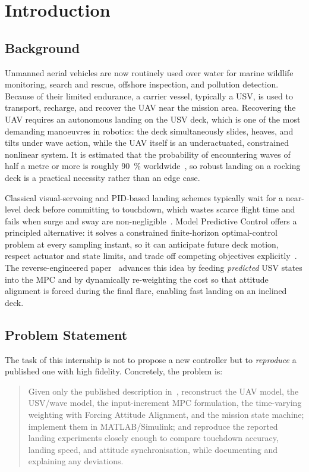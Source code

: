 \documentclass[12pt,a4paper]{report}
\begin{document}
\chapter{Introduction}

\section{Background}
Unmanned aerial vehicles are now routinely used over water for marine wildlife monitoring, search and rescue, offshore inspection, and pollution detection. Because of their limited endurance, a carrier vessel, typically a USV, is used to transport, recharge, and recover the UAV near the mission area. Recovering the UAV requires an autonomous landing on the USV deck, which is one of the most demanding manoeuvres in robotics: the deck simultaneously slides, heaves, and tilts under wave action, while the UAV itself is an underactuated, constrained nonlinear system. It is estimated that the probability of encountering waves of half a metre or more is roughly \SI{90}{\percent} worldwide~\cite{fossen2011}, so robust landing on a rocking deck is a practical necessity rather than an edge case.

Classical visual-servoing and PID-based landing schemes typically wait for a near-level deck before committing to touchdown, which wastes scarce flight time and fails when surge and sway are non-negligible~\cite{gupta2023,cho2022}. Model Predictive Control offers a principled alternative: it solves a constrained finite-horizon optimal-control problem at every sampling instant, so it can anticipate future deck motion, respect actuator and state limits, and trade off competing objectives explicitly~\cite{garcia1989,mayne2000}. The reverse-engineered paper~\cite{prochazka2024} advances this idea by feeding \emph{predicted} USV states into the MPC and by dynamically re-weighting the cost so that attitude alignment is forced during the final flare, enabling fast landing on an inclined deck.

\section{Problem Statement}
The task of this internship is not to propose a new controller but to \emph{reproduce} a published one with high fidelity. Concretely, the problem is:
\begin{quote}
Given only the published description in~\cite{prochazka2024}, reconstruct the UAV model, the USV/wave model, the input-increment MPC formulation, the time-varying weighting with Forcing Attitude Alignment, and the mission state machine; implement them in MATLAB/Simulink; and reproduce the reported landing experiments closely enough to compare touchdown accuracy, landing speed, and attitude synchronisation, while documenting and explaining any deviations.
\end{quote}
\end{document}
